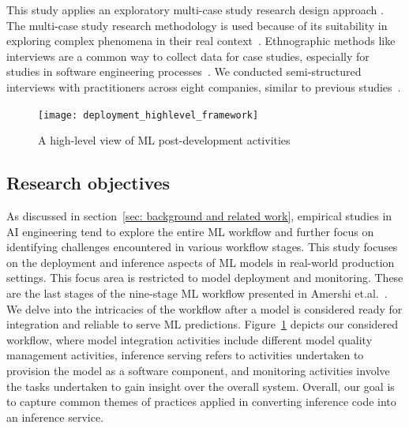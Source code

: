 

This study applies an exploratory multi-case study research design approach \cite{runeson2009guidelines}. The multi-case study research methodology is used because of its suitability in exploring complex phenomena in their real context~\cite{easterbrook2008selecting, runeson2009guidelines}. Ethnographic methods like interviews are a common way to collect data for case studies, especially for studies in software engineering processes~\cite{giray2021software}. We conducted semi-structured interviews with practitioners across eight companies, similar to previous studies~\cite{shankar2022operationalizing, baier2019challenges, lwakatare2019taxonomy}.

\begin{figure}[h]
\centering
\texttt{[image: deployment\_highlevel\_framework]}
\caption{A high-level view of ML post-development activities}
\label{fig:deployment_highlevel_framework}
\end{figure}

\subsection{Research objectives}
As discussed in section~\ref{sec: background and related work}, empirical studies in AI engineering \cite{bosch2021engineering} tend to explore the entire ML workflow and further focus on identifying challenges encountered in various workflow stages. This study focuses on the deployment and inference aspects of ML models in real-world production settings. This focus area is restricted to model deployment and monitoring. These are the last stages of the nine-stage ML workflow presented in Amershi et.al.~\cite {amershi2019software}. We delve into the intricacies of the workflow after a model is considered ready for integration and reliable to serve ML predictions. Figure~\ref{fig:deployment_highlevel_framework} depicts our considered workflow, where model integration activities include different model quality management activities, inference serving refers to activities undertaken to provision the model as a software component, and monitoring activities involve the tasks undertaken to gain insight over the overall system. Overall, our goal is to capture common themes of practices applied in converting inference code into an inference service.

